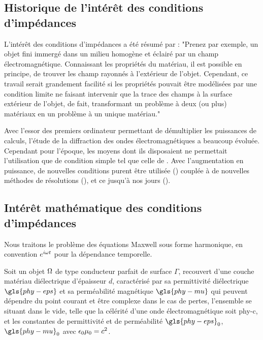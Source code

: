 
\subsection*{Historique de l’intérêt des conditions d'impédances}

L’intérêt des conditions d'impédances a été résumé par \cite{senior_approximate_1995}:
"Prenez par exemple, un objet fini immergé dans un milieu homogène et éclairé par un champ électromagnétique.
Connaissant les propriétés du matériau, il est possible en principe, de trouver les champ rayonnés à l'extérieur de l'objet.
Cependant, ce travail serait grandement facilité si les propriétés pouvait être modélisées par une condition limite ne faisant intervenir que la trace des champs à la surface extérieur de l'objet, de fait, transformant un problème à deux (ou plus) matériaux en un problème à un unique matériau."

Avec l'essor des premiers ordinateur permettant de démultiplier les puissances de calculs, l'étude de la diffraction des ondes électromagnétiques a beaucoup évoluée. Cependant pour l'époque, les moyens dont ils disposaient ne permettait l'utilisation que de condition simple tel que celle de \cite{leontovich_investigations_1948}. Avec l'augmentation en puissance, de nouvelles conditions purent être utilisée (\cite{ruck_radar_1970}) couplée à de nouvelles méthodes de résolutions (\cite{mautz_h-field_1977}), et ce jusqu'à nos jours (\cite{senior_approximate_1995,hoppe_impedance_1995,bendali_boundary-element_1999,nedelec_acoustic_2001,yuferev_surface_2009}). 


\subsection*{Intérêt mathématique des conditions d'impédances}
Nous traitons le problème des équations Maxwell sous forme harmonique, en convention $e^{i\omega t}$ pour la dépendance temporelle.


Soit un objet $\Omega$ de type conducteur parfait de surface $\Gamma$, recouvert d'une couche matériau diélectrique d'épaisseur $d$, caractérisé par sa permittivité diélectrique $\gls{phy-eps}$ et sa perméabilité magnétique $\gls{phy-mu}$ qui peuvent dépendre du point courant et être complexe dans le cas de pertes, l'ensemble se situant dans le vide, telle que la célérité d'une onde électromagnétique soit \gls{phy-c}, et les constantes de permittivité et de perméabilité $\gls{phy-eps}_0$, $\gls{phy-mu}_0$ avec $\epsilon_0\mu_0 = c^{2}$.


